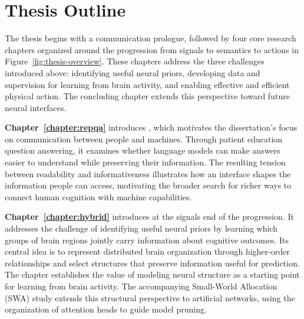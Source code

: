 

\section{Thesis Outline}

The thesis begins with a communication prologue, followed by four core research chapters organized around the progression from signals to semantics to actions in Figure~\ref{fig:thesis-overview}. These chapters address the three challenges introduced above: identifying useful neural priors, developing data and supervision for learning from brain activity, and enabling effective and efficient physical action. The concluding chapter extends this perspective toward future neural interfaces.

\textbf{Chapter~\ref{chapter:repqa}} introduces \repqa{}, which motivates the dissertation's focus on communication between people and machines. Through patient education question answering, it examines whether language models can make answers easier to understand while preserving their information. The resulting tension between readability and informativeness illustrates how an interface shapes the information people can access, motivating the broader search for richer ways to connect human cognition with machine capabilities.

\textbf{Chapter~\ref{chapter:hybrid}} introduces \hybrid{} at the signals end of the progression. It addresses the challenge of identifying useful neural priors by learning which groups of brain regions jointly carry information about cognitive outcomes. Its central idea is to represent distributed brain organization through higher-order relationships and select structures that preserve information useful for prediction. The chapter establishes the value of modeling neural structure as a starting point for learning from brain activity. The accompanying Small-World Allocation (SWA) study extends this structural perspective to artificial networks, using the organization of attention heads to guide model pruning.

